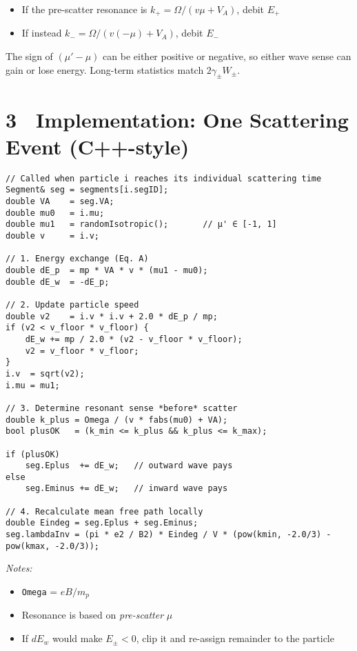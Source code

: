 {\begin{itemize}
  \item If the pre-scatter resonance is $k_{+} = \Omega / (v \mu + V_A)$, debit $E_{+}$
  \item If instead $k_{-} = \Omega / (v (-\mu) + V_A)$, debit $E_{-}$
\end{itemize}

The sign of $(\mu' - \mu)$ can be either positive or negative, so either wave sense can gain or lose energy. Long-term statistics match $2\gamma_\pm W_\pm$.

\section*{3 Implementation: One Scattering Event (C++-style)}

\begin{lstlisting}
// Called when particle i reaches its individual scattering time
Segment& seg = segments[i.segID];
double VA    = seg.VA;
double mu0   = i.mu;
double mu1   = randomIsotropic();       // μ' ∈ [-1, 1]
double v     = i.v;

// 1. Energy exchange (Eq. A)
double dE_p  = mp * VA * v * (mu1 - mu0);
double dE_w  = -dE_p;

// 2. Update particle speed
double v2    = i.v * i.v + 2.0 * dE_p / mp;
if (v2 < v_floor * v_floor) {
    dE_w += mp / 2.0 * (v2 - v_floor * v_floor);
    v2 = v_floor * v_floor;
}
i.v  = sqrt(v2);
i.mu = mu1;

// 3. Determine resonant sense *before* scatter
double k_plus = Omega / (v * fabs(mu0) + VA);
bool plusOK   = (k_min <= k_plus && k_plus <= k_max);

if (plusOK)
    seg.Eplus  += dE_w;   // outward wave pays
else
    seg.Eminus += dE_w;   // inward wave pays

// 4. Recalculate mean free path locally
double Eindeg = seg.Eplus + seg.Eminus;
seg.lambdaInv = (pi * e2 / B2) * Eindeg / V * (pow(kmin, -2.0/3) - pow(kmax, -2.0/3));
\end{lstlisting}

\textit{Notes:}
\begin{itemize}
  \item \texttt{Omega} = $eB/m_p$
  \item Resonance is based on \emph{pre-scatter} $\mu$
  \item If $dE_w$ would make $E_\pm < 0$, clip it and re-assign remainder to the particle
\end{itemize}

}
